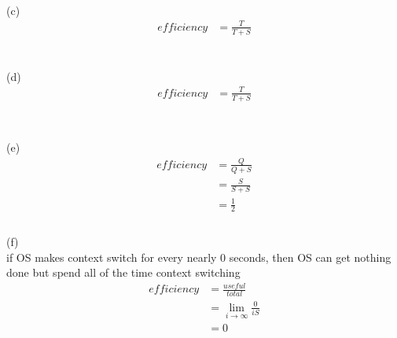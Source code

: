 \documentclass[12pt, border = 4pt, multi]{article} %
\begin{document}
\\
(c)\\
\begin{align*}
efficiency &= \frac{T}{T + S}
\end{align*}
\\
\\
(d)
\begin{align*}
efficiency &= \frac{T}{T + S}\\
\end{align*}
\\
\\
(e)
\begin{align*}
efficiency &= \frac{Q}{Q + S}\\
&= \frac{S}{S + S}\\
&= \frac{1}{2}\\
\end{align*}
\\
(f)\\
if OS makes context switch for every nearly 0 seconds, then OS can get nothing done but spend all of the time context switching 
\begin{align*}
efficiency &= \frac{useful}{total}\\
&= \lim_{i \rightarrow \infty}\frac{0}{iS}\\
&= 0
\end{align*}
\end{document}
